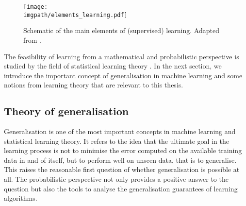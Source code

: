 {\begin{figure}[htb]
  \begin{center}
    \texttt{[image: \\imgpath/elements\_learning.pdf]}
  \end{center}
  \caption{Schematic of the main elements of (supervised) learning. Adapted from \citet{abu2012learningfromdata}.}
\label{fig:background-elements_learning}
\end{figure}

The feasibility of learning from a mathematical and probabilistic perspective is studied by the field of statistical learning theory \citep{vapnik1995learningtheory, bousquet2003learningtheory, vonluxburg2011learningtheory}. In the next section, we introduce the important concept of generalisation in machine learning and some notions from learning theory that are relevant to this thesis. 

\subsection{Theory of generalisation}
\label{sec:background-generalisation}
Generalisation is one of the most important concepts in machine learning and statistical learning theory. It refers to the idea that the ultimate goal in the learning process is not to minimise the error computed on the available training data in and of itself, but to perform well on unseen data, that is to generalise. This raises the reasonable first question of whether generalisation is possible at all. The probabilistic perspective not only provides a positive answer to the question but also the tools to analyse the generalisation guarantees of learning algorithms.

}
